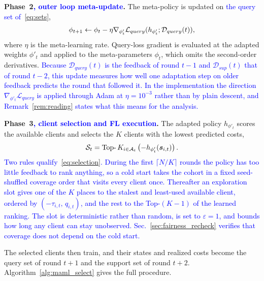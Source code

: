 \documentclass[journal]{IEEEtran}
\theoremstyle{remark}
\newcommand{\revision}[1]{#1}
\newcommand{\revtwo}[1]{\textcolor{blue}{#1}}
\begin{document}
\textbf{Phase~2\revtwo{, outer loop meta-update}.}
\revision{%
The meta-policy is updated on \revtwo{the query set of~\eqref{eq:sets}},}
\begin{equation}
		\color{black}
		\phi_{t+1} \leftarrow \phi_t - \eta \nabla_{\phi'_t} \mathcal{L}_{query}(h_{\phi'_t}; \mathcal{D}_{query}(t)),
		\label{eq:outer_loop}
\end{equation}
\revision{where $\eta$ is the meta-learning rate. %
Query-loss gradient is evaluated at the adapted weights $\phi'_t$ and applied to the meta-parameters $\phi_t$, which omits the second-order derivatives.} \revtwo{Because $\mathcal{D}_{query}(t)$ is the feedback of round $t-1$ and $\mathcal{D}_{sup}(t)$ that of round $t-2$, this update measures how well one adaptation step on older feedback predicts the round that followed it. In the implementation the direction $\nabla_{\phi'_t}\mathcal{L}_{query}$ is applied through Adam at $\eta=10^{-3}$ rather than by plain descent, and Remark~\ref{rem:reading} states what this means for the analysis.}

\textbf{Phase~3\revtwo{, client selection and FL execution}.}
\revision{The adapted policy $h_{\phi'_t}$ scores the available clients and selects the $K$ clients with the lowest predicted costs,}
\begin{equation}
	\color{black}
	\mathcal{S}_t = \operatorname{Top-}K_{i \in \mathcal{A}_t} \left( -h_{\phi'_t}(\bm{s}_{i,t}) \right).
	\label{eq:selection}
\end{equation}
\revtwo{Two rules qualify~\eqref{eq:selection}. During the first $\lceil N/K\rceil$ rounds the policy has too little feedback to rank anything, so a cold start takes the cohort in a fixed seed-shuffled coverage order that visits every client once. Thereafter an exploration slot gives one of the $K$ places to the stalest and least-used available client, ordered by $(-\tau_{i,t},\,q_{i,t})$, and the rest to the Top-$(K-1)$ of the learned ranking. The slot is deterministic rather than random, is set to $\varepsilon=1$, and bounds how long any client can stay unobserved. Sec.~\ref{sec:fairness_recheck} verifies that coverage does not depend on the cold start.}

\revision{The selected clients then train, and their states and realized costs become the query set of round $t+1$ and the support set of round $t+2$. Algorithm~\ref{alg:maml_select} gives the full procedure.}
\end{document}
